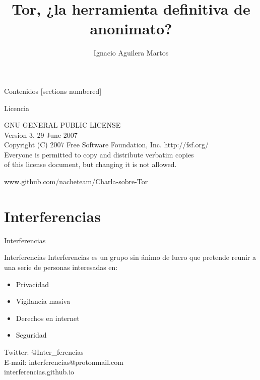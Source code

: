 \documentclass[10pt]{beamer}
\title{Tor, ¿la herramienta definitiva de anonimato?}
\date{}
\author{Ignacio Aguilera Martos}
\begin{document}
	

	
	
\frame{\titlepage}

	
\begin{frame}{Contenidos}
	[sections numbered]
	\tableofcontents[hideallsubsections]
\end{frame}

\begin{frame}{Licencia}
	\begin{center}
		GNU GENERAL PUBLIC LICENSE \\
		Version 3, 29 June 2007 \\
		
		Copyright (C) 2007 Free Software Foundation, Inc. http://fsf.org/ \\
		Everyone is permitted to copy and distribute verbatim copies \\
		of this license document, but changing it is not allowed.
	\end{center}
\centering	www.github.com/nacheteam/Charla-sobre-Tor
\end{frame}

\section{Interferencias}

\begin{frame}{Interferencias}
	\begin{block}{Interferencias}
		Interferencias es un grupo sin ánimo de lucro que pretende reunir a una serie de personas interesadas en:
		
		\begin{itemize}
			\item Privacidad
			\item Vigilancia masiva
			\item Derechos en internet
			\item Seguridad
		\end{itemize}
	\end{block}
	\begin{center}
		Twitter: @Inter\_ferencias \\
		E-mail: interferencias@protonmail.com \\
		interferencias.github.io
	\end{center}
\end{frame}
\end{document}
